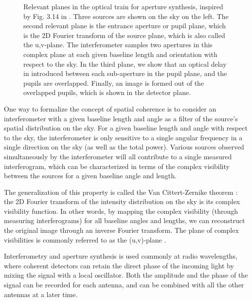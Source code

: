 \begin{figure}[!h]
	\centering
	
	\caption[Aperture synthesis]{Relevant planes in the optical train for aperture synthesis, inspired by Fig. 3.14 in \cite{Glindemann:2011hk}. Three sources are shown on the sky on the left. The second relevant plane is the entrance aperture or pupil plane, which is the 2D Fourier transform of the source plane, which is also called the u,v-plane. The interferometer samples two apertures in this complex plane at each given baseline length and orientation with respect to the sky. In the third plane, we show that an optical delay in introduced between each sub-aperture in the pupil plane, and the pupils are overlapped. Finally, an image is formed out of the overlapped pupils, which is shown in the detector plane.}
	\label{fig:aperturesynthesis}
    \end{figure}



One way to formalize the concept of spatial coherence is to consider an interferometer with a given baseline length and angle as a filter of the source's spatial distribution on the sky. For a given baseline length and angle with respect to the sky, the interferometer is only sensitive to a single angular frequency in a single direction on the sky (as well as the total power). Various sources observed simultaneously by the interferometer will all contribute to a single measured interferogram, which can be characterized in terms of the complex visibility between the sources for a given baseline angle and length. 

The generalization of this property is called the Van Cittert-Zernike theorem \citep{Zernike:1938kq}: the 2D Fourier transform of the intensity distribution on the sky is its complex visibility function. In other words, by mapping the complex visibility (through measuring interferograms) for all baseline angles and lengths, we can reconstruct the original image through an inverse Fourier transform. The plane of complex visibilities is commonly referred to as the (u,v)-plane \citep{Thompson:2008ww}.

Interferometry and aperture synthesis is used commonly at radio wavelengths, where coherent detectors can retain the direct phase of the incoming light by mixing the signal with a local oscillator. Both the amplitude and the phase of the signal can be recorded for each antenna, and can be combined with all the other antennas at a later time.

